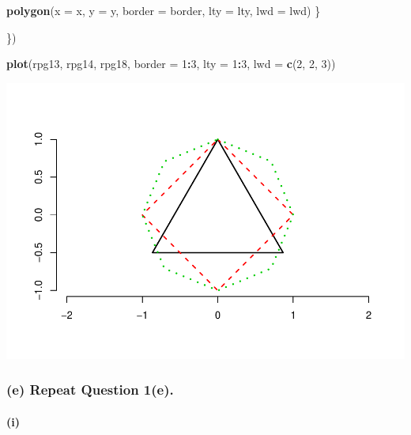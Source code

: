 \documentclass[]{article}
\newenvironment{Shaded}{\begin{snugshade}}{\end{snugshade}}
\newcommand{\KeywordTok}[1]{\textcolor[rgb]{0.13,0.29,0.53}{\textbf{#1}}}
\newcommand{\DataTypeTok}[1]{\textcolor[rgb]{0.13,0.29,0.53}{#1}}
\newcommand{\DecValTok}[1]{\textcolor[rgb]{0.00,0.00,0.81}{#1}}
\newcommand{\OperatorTok}[1]{\textcolor[rgb]{0.81,0.36,0.00}{\textbf{#1}}}
\newcommand{\NormalTok}[1]{#1}
\let\oldparagraph\paragraph
\renewcommand{\paragraph}[1]{\oldparagraph{#1}\mbox{}}
\begin{document}
\begin{Shaded}
\begin{Highlighting}[]
    \KeywordTok{polygon}\NormalTok{(}\DataTypeTok{x =}\NormalTok{ x, }\DataTypeTok{y =}\NormalTok{ y, }\DataTypeTok{border =}\NormalTok{ border, }\DataTypeTok{lty =}\NormalTok{ lty, }\DataTypeTok{lwd =}\NormalTok{ lwd)}
\NormalTok{  \}}
  
\NormalTok{\})}

\KeywordTok{plot}\NormalTok{(rpg13, rpg14, rpg18, }\DataTypeTok{border =} \DecValTok{1}\OperatorTok{:}\DecValTok{3}\NormalTok{, }\DataTypeTok{lty =} \DecValTok{1}\OperatorTok{:}\DecValTok{3}\NormalTok{, }\DataTypeTok{lwd =} \KeywordTok{c}\NormalTok{(}\DecValTok{2}\NormalTok{, }\DecValTok{2}\NormalTok{, }\DecValTok{3}\NormalTok{))}
\end{Highlighting}
\end{Shaded}

\includegraphics{Assigment4_files/figure-latex/unnamed-chunk-10-1.pdf}

\subsubsection{(e) Repeat Question 1(e).}\label{e-repeat-question-1e.}

\paragraph{(i)}\label{i}
\end{document}

